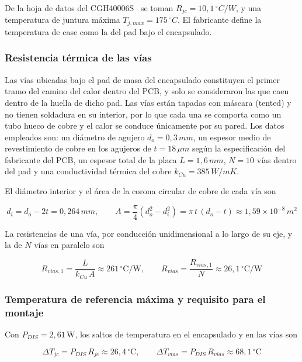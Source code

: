 De la hoja de datos del CGH40006S~\cite{macom} se toman $R_{jc} = 10,1\,^{\circ}C/W$, y una temperatura de juntura máxima $T_{j,max} = 175\,^{\circ}C$. El fabricante define la temperatura de case como la del pad bajo el encapsulado.

\subsubsection{Resistencia térmica de las vías}
Las vías ubicadas bajo el pad de masa del encapsulado constituyen el primer tramo del camino del calor dentro del PCB, y solo se consideraron las que caen dentro de la huella de dicho pad. Las vías están tapadas con máscara (tented) y no tienen soldadura en su interior, por lo que cada una se comporta como un tubo hueco de cobre y el calor se conduce únicamente por su pared. Los datos empleados son: un diámetro de agujero $d_o = 0,3\,mm$, un espesor medio de revestimiento de cobre en los agujeros de $t = 18\,\mu m$ según la especificación del fabricante del PCB, un espesor total de la placa $L=1,6\,mm$, $N=10$ vías dentro del pad y una conductividad térmica del cobre $k_{Cu} = 385\,W/mK$.

El diámetro interior y el área de la corona circular de cobre de cada vía son

\begin{equation}
    d_i = d_o - 2t = 0,264\,mm, \qquad A = \frac{\pi}{4}\left(d_o^2 - d_i^2\right) = \pi \, t \, (d_o - t) \approx 1,59 \times 10^{-8}\,m^2
    \label{eq:th_area}
\end{equation}

La resistencias de una vía, por conducción unidimensional a lo largo de su eje, y la de $N$ vías en paralelo son

\begin{equation}
    R_{vias,1} = \frac{L}{k_{Cu}\,A} \approx 261\,^{\circ}\text{C/W}, \qquad R_{vias} = \frac{R_{vias,1}}{N} \approx 26,1\,^{\circ}\text{C/W}
    \label{eq:th_rvias}
\end{equation}

\subsubsection{Temperatura de referencia máxima y requisito para el montaje}
Con $P_{DIS} = 2,61\,\text{W}$, los saltos de temperatura en el encapsulado y en las vías son

\begin{equation}
    \Delta T_{jc} = P_{DIS}\,R_{jc} \approx 26,4\,^{\circ}\text{C}, \qquad \Delta T_{vias} = P_{DIS}\,R_{vias} \approx 68,1\,^{\circ}\text{C}
    \label{eq:th_saltos}
\end{equation}

